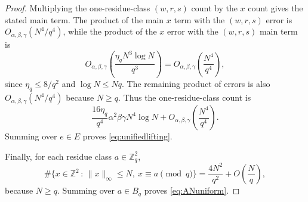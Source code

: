 \documentclass[10pt,a4paper]{amsart}
\numberwithin{equation}{section}
\newcommand{\norm}[1]{\lVert #1\rVert_\infty}
\renewcommand{\le}{\leqslant}
\renewcommand{\ge}{\geqslant}
\begin{document}
\begin{proof}
Multiplying the one-residue-class $(w,r,s)$ count by the $x$ count gives the stated main term. The product of the main $x$ term with the $(w,r,s)$ error is $O_{\alpha,\beta,\gamma}(N^4/q^4)$, while the product of the $x$ error with the $(w,r,s)$ main term is
\[ O_{\alpha,\beta,\gamma}\!\left(\frac{\eta_q N^3\log N}{q^3}\right)
=O_{\alpha,\beta,\gamma}\!\left(\frac{N^4}{q^4}\right), \]
since $\eta_q\le 8/q^2$ and $\log N\le Nq$. The remaining product of errors is also $O_{\alpha,\beta,\gamma}(N^4/q^4)$ because $N\ge q$. Thus the one-residue-class count is
\[ \frac{16\eta_q}{q^4}\alpha^2\beta\gamma N^4\log N + O_{\alpha,\beta,\gamma}\!\left(\frac{N^4}{q^4}\right). \]
Summing over $e\in E$ proves \eqref{eq:unifiedlifting}.

Finally, for each residue class $a\in\mathbb{Z}_q^2$,
\[ \#\{x\in\mathbb{Z}^2 \,:\, \norm{x}\le N,\ x\equiv a\!\!\!\pmod q\}
=\frac{4N^2}{q^2}+O\left(\frac{N}{q}\right), \]
because $N\ge q$. Summing over $a\in B_q$ proves \eqref{eq:ANuniform}.
\end{proof}
\end{document}
